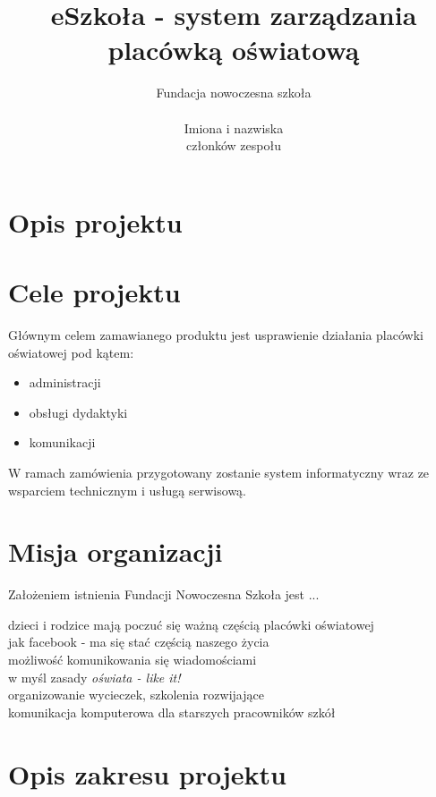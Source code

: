 \documentclass{article}
\author{Fundacja nowoczesna szkoła\\\\
Imiona i nazwiska\\członków zespołu} %
\title{eSzkoła - system zarządzania placówką oświatową}
\begin{document}
\maketitle
\newpage
\tableofcontents
\newpage

\section{Opis projektu}

\section{Cele projektu}
Głównym celem zamawianego produktu jest usprawienie działania placówki oświatowej pod kątem:
\begin{itemize}
    \item administracji
    \item obsługi dydaktyki
    \item komunikacji
\end{itemize}

W ramach zamówienia przygotowany zostanie system informatyczny wraz ze wsparciem technicznym i usługą serwisową. 


\section{Misja organizacji}
Założeniem istnienia Fundacji Nowoczesna Szkoła jest ... %

dzieci i rodzice mają poczuć się ważną częścią placówki oświatowej\\
jak facebook - ma się stać częścią naszego życia\\
możliwość komunikowania się wiadomościami\\
w myśl zasady \textit{ oświata - like it!}\\
organizowanie wycieczek, szkolenia rozwijające \\
komunikacja komputerowa dla starszych pracowników szkół

\section{Opis zakresu projektu}
\end{document}
